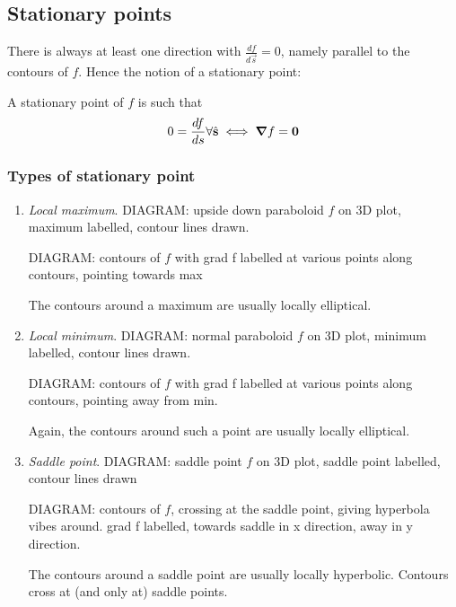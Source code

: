 \documentclass{../../template/note}
\begin{document}
    \subsection{Stationary points}

    There is always at least one direction with \(\frac{df}{d \vec s} = 0\), namely parallel to the contours of \(f\). Hence the notion of a stationary point:

    \begin{definition}
        A stationary point of \(f\) is such that
        \[
            0 = \frac{df}{ds} \forall \hvec s \iff \grad f = \vec 0
        \]
    \end{definition}

    \subsubsection{Types of stationary point}

    \begin{enumerate}[label=\protect\circled{\arabic*}]
        \item \emph{Local maximum}.
        DIAGRAM: upside down paraboloid \(f\) on 3D plot, maximum labelled, contour lines drawn.

        DIAGRAM: contours of \(f\) with grad f labelled at various points along contours, pointing towards max

        The contours around a maximum are usually locally elliptical.
        \item \emph{Local minimum}.
        DIAGRAM: normal paraboloid \(f\) on 3D plot, minimum labelled, contour lines drawn.

        DIAGRAM: contours of \(f\) with grad f labelled at various points along contours, pointing away from min.

        Again, the contours around such a point are usually locally elliptical.
        \item \emph{Saddle point}. 
        DIAGRAM: saddle point \(f\) on 3D plot, saddle point labelled, contour lines drawn

        DIAGRAM: contours of \(f\), crossing at the saddle point, giving hyperbola vibes around. grad f labelled, towards saddle in x direction, away in y direction.

        The contours around a saddle point are usually locally hyperbolic. Contours cross at (and only at) saddle points.
    \end{enumerate}
    
\end{document}
